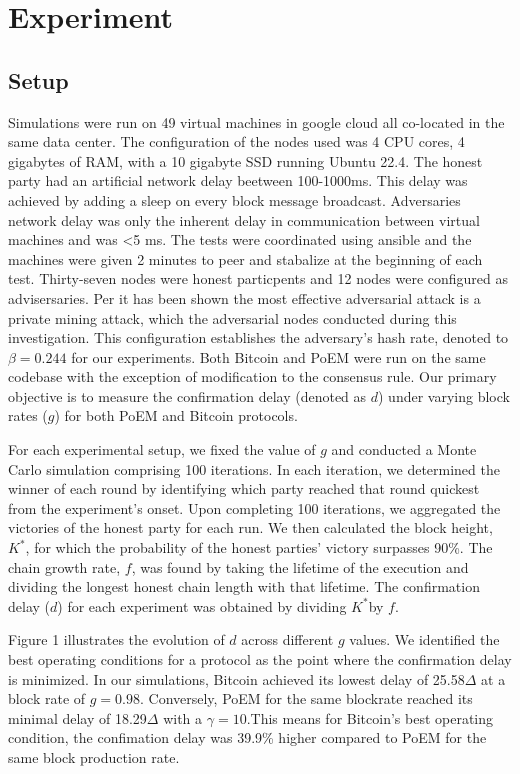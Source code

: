 \section{Experiment}

\subsection{Setup}

Simulations were run on 49 virtual machines in google cloud all co-located in
the same data center. The configuration of the nodes used was 4 CPU cores, 4
gigabytes of RAM, with a 10 gigabyte SSD running Ubuntu 22.4. The honest party
had an artificial network delay beetween 100-1000ms. This delay was achieved by
adding a sleep on every block message broadcast. Adversaries network delay was
only the inherent delay in communication between virtual machines and was <5 ms.
The tests were coordinated using ansible and the machines were given 2 minutes
to peer and stabalize at the beginning of each test. Thirty-seven nodes were
honest particpents and 12 nodes were configured as advisersaries.
Per\cite{eiar} it has been shown the most effective adversarial attack is a
private mining attack, which the adversarial nodes conducted during this
investigation. This configuration establishes the adversary's hash rate, denoted
to $\beta=0.244$ for our experiments. Both Bitcoin and PoEM were run on the same codebase 
with the exception of modification to the consensus rule. Our primary objective is to
measure the confirmation delay (denoted as $d$) under varying block rates ($g$)
for both PoEM and Bitcoin protocols.

For each experimental setup, we fixed the value of $g$ and conducted a Monte
Carlo simulation comprising 100 iterations. In each iteration, we determined
the winner of each round by identifying which party reached that round quickest
from the experiment's onset. Upon completing 100 iterations, we aggregated the
victories of the honest party for each run. We then calculated the block
height, $K^*$, for which the probability of the honest parties' victory
surpasses 90\%. The chain growth rate, $f$, was found by taking the lifetime of
the execution and dividing the longest honest chain length with that lifetime.
The confirmation delay ($d$) for each experiment was obtained by dividing
$K^*$by $f$.

Figure 1 illustrates the evolution of $d$ across different $g$ values. We
identified the best operating conditions for a protocol as the point where the
confirmation delay is minimized. In our simulations, Bitcoin achieved its lowest
delay of 25.58$\Delta$ at a block rate of $g=0.98$. Conversely, PoEM for the
same blockrate reached its minimal delay of 18.29$\Delta$ with a
$\gamma=10$.This means for Bitcoin's best operating condition, the confimation
delay was 39.9\% higher compared to PoEM for the same block production rate. 

